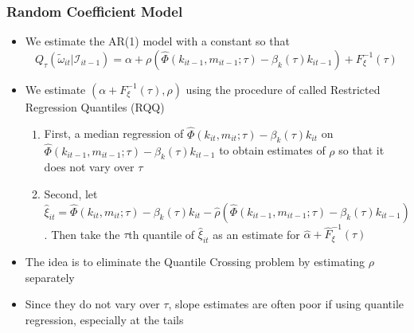 \documentclass{beamer}
\begin{document}

\begin{frame}
\frametitle{Random Coefficient Model}
\begin{itemize}
	\item We estimate the AR(1) model with a constant so that
	\begin{equation}
	Q_{\tau}(\tilde{\omega}_{it}|\mathcal{I}_{it-1})=\alpha+\rho(\hat{\Phi}(k_{it-1}, m_{it-1}; \tau)-\beta_{k}(\tau)k_{it-1})+F_{\xi}^{-1}(\tau)
	\end{equation}
	\item We estimate $(\alpha+F_{\xi}^{-1}(\tau), \rho)$ using the procedure of \cite{He1997} called Restricted Regression Quantiles (RQQ)
		\begin{enumerate}
			\item First, a median regression of $\hat{\Phi}(k_{it}, m_{it}; \tau)-\beta_{k}(\tau)k_{it}$ on $\hat{\Phi}(k_{it-1}, m_{it-1}; \tau)-\beta_{k}(\tau)k_{it-1}$ to obtain estimates of $\rho$ so that it does not vary over $\tau$
			\item Second, let $\hat{\xi}_{it}=\hat{\Phi}(k_{it}, m_{it}; \tau)-\beta_{k}(\tau)k_{it}-\hat{\rho}(\hat{\Phi}(k_{it-1}, m_{it-1}; \tau)-\beta_{k}(\tau)k_{it-1})$. Then take the $\tau$th quantile of $\hat{\xi}_{it}$ as an estimate for $\hat{\alpha}+\hat{F}_{\xi}^{-1}(\tau)$
		\end{enumerate}
		\item The idea is to eliminate the Quantile Crossing problem by estimating $\rho$ separately 
		\item Since they do not vary over $\tau$, slope estimates are often poor if using quantile regression, especially at the tails
\end{itemize}
\end{frame}

\end{document}
